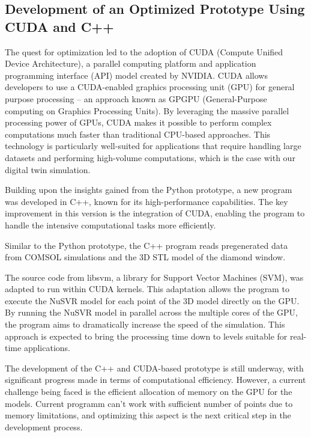 \subsection{Development of an Optimized Prototype Using CUDA and C++}

The quest for optimization led to the adoption of CUDA (Compute Unified Device
Architecture), a parallel computing platform and application programming
interface (API) model created by NVIDIA. CUDA allows developers to use a
CUDA-enabled graphics processing unit (GPU) for general purpose processing – an
approach known as GPGPU (General-Purpose computing on Graphics Processing
Units). By leveraging the massive parallel processing power of GPUs, CUDA makes
it possible to perform complex computations much faster than traditional
CPU-based approaches. This technology is particularly well-suited for
applications that require handling large datasets and performing high-volume
computations, which is the case with our digital twin simulation.

Building upon the insights gained from the Python prototype, a new program was
developed in C++, known for its high-performance capabilities. The key
improvement in this version is the integration of CUDA, enabling the program to
handle the intensive computational tasks more efficiently.

Similar to the Python prototype, the C++ program reads pregenerated data from
COMSOL simulations and the 3D STL model of the diamond window.

The source code from libsvm, a library for Support Vector Machines (SVM), was
adapted to run within CUDA kernels. This adaptation allows the program to
execute the NuSVR model for each point of the 3D model directly on the GPU. By
running the NuSVR model in parallel across the multiple cores of the GPU, the
program aims to dramatically increase the speed of the simulation. This
approach is expected to bring the processing time down to levels suitable for
real-time applications.

The development of the C++ and CUDA-based prototype is still underway, with
significant progress made in terms of computational efficiency. However, a
current challenge being faced is the efficient allocation of memory on the GPU
for the models. Current programm can't work with sufficient number of points
due to memory limitations, and optimizing this aspect is the next critical step
in the development process.
